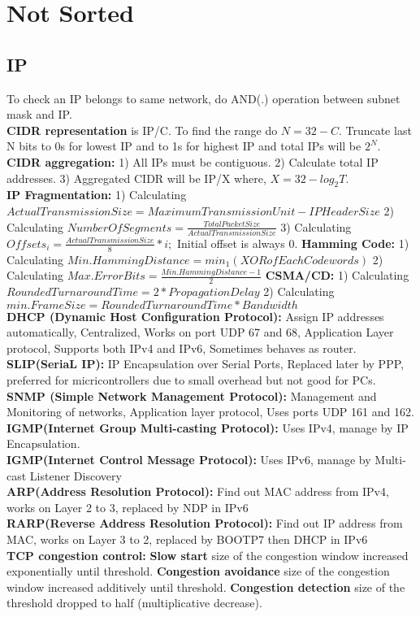 \chapter{Not Sorted}
\section{IP}
To check an IP belongs to same network, do AND(.) operation between subnet mask and IP.\\
\textbf{CIDR representation} is IP/C. To find the range do $N = 32-C$. Truncate last N bits to 0s for lowest IP and to 1s for highest IP and total IPs will be $2^N$.\\
\textbf{CIDR aggregation:} 1) All IPs must be contiguous. 2) Calculate total IP addresses. 3) Aggregated CIDR will be IP/X where, $X = 32-log_2T$.\\
\textbf{IP Fragmentation:} 1) Calculating $ActualTransmissionSize = MaximumTransmissionUnit - IPHeaderSize$ 2) Calculating $NumberOfSegments = \frac{TotalPacketSize}{ActualTransmissionSize} $ 3) Calculating $Offsets_i = \frac{ActualTransmissionSize}{8}*i  ;$ Initial offset is always 0.
\textbf{Hamming Code:} 1) Calculating $Min.HammingDistance=min_1(XORofEachCodewords)$ 2) Calculating $Max.ErrorBits=\frac{Min.HammingDistance-1}{2}$
\textbf{CSMA/CD:} 1) Calculating $RoundedTurnaroundTime = 2* PropagationDelay$ 2) Calculating $min.FrameSize = RoundedTurnaroundTime*Bandwidth$\\
\textbf{DHCP (Dynamic Host Configuration Protocol):} Assign IP addresses automatically, Centralized, Works on port UDP 67 and 68, Application Layer protocol, Supports both IPv4 and IPv6, Sometimes behaves as router.\\
\textbf{SLIP(SeriaL IP):} IP Encapsulation over Serial Ports, Replaced later by PPP, preferred for micricontrollers due to small overhead but not good for PCs.\\
\textbf{SNMP (Simple Network Management Protocol):} Management and Monitoring of networks, Application layer protocol, Uses ports UDP 161 and 162.\\
\textbf{IGMP(Internet Group Multi-casting Protocol):} Uses IPv4, manage by IP Encapsulation.\\
\textbf{IGMP(Internet Control Message Protocol):} Uses IPv6, manage by Multi-cast Listener Discovery\\
\textbf{ARP(Address Resolution Protocol):} Find out MAC address from IPv4, works on Layer 2 to 3, replaced by NDP in IPv6\\
\textbf{RARP(Reverse Address Resolution Protocol):} Find out IP address from MAC, works on Layer 3 to 2, replaced by BOOTP7 then DHCP in IPv6\\
\textbf{TCP congestion control:}
\textbf{Slow start} size of the congestion window increased exponentially until threshold.
\textbf{Congestion avoidance} size of the congestion window increased additively until threshold.
\textbf{Congestion detection} size of the threshold dropped to half (multiplicative decrease).